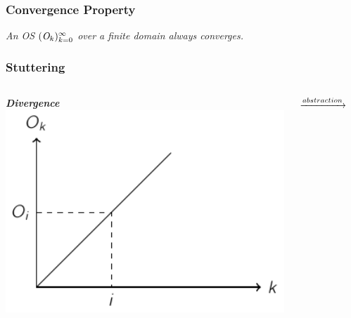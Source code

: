 \documentclass[aspectratio=169]{beamer}
\newcommand{\rhand}{\color{red}{\ding{43}}}
\begin{document}
\begin{frame}
  \frametitle{Convergence Property}
  \begin{block}{}
    \begin{center}
      \emph{An OS $\OS$ over a \alert{finite} domain always converges.}
    \end{center}
  \end{block}
\end{frame}

\begin{frame}
  \frametitle{Stuttering}
  \begin{block}{}%
    \begin{columns}
      \begin{column}{0.45\textwidth}
        \begin{center}{\scriptsize  \textbf{\textit{Divergence}}}
          \includegraphics[width=1\textwidth]{figures/diverge}
        \end{center}
      \end{column}
      \begin{column}{0.12\textwidth}
        \begin{center}
          \alert{$\xrightarrow[]{\small{abstraction}}$}
        \end{center}
      \end{column}
      \begin{column}{0.45\textwidth}

\end{column}
\end{columns}
\end{block}
\end{frame}
\end{document}
